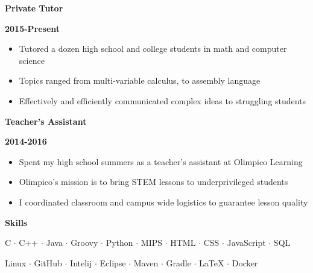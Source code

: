 \documentclass[12pt]{report}
\newcommand\barTitle[1]{\begin{center} \begin{Large}{\textbf{#1}}\end{Large}\end{center}}
\newcommand\tbf[1]{\begin{large} \textbf{#1} \end{large}}
\begin{document}
\begin{flushleft}
\tbf{Private Tutor} \hfill \tbf{2015-Present}
\end{flushleft}

\begin{itemize}
\item Tutored a dozen high school and college students in math and computer science
\item Topics ranged from multi-variable calculus, to assembly language 
\item Effectively and efficiently communicated complex ideas to struggling students 
\end{itemize}

\begin{flushleft}
\tbf{Teacher's Assistant} \hfill \tbf{2014-2016}
\end{flushleft}

\begin{itemize}
\item Spent my high school summers as a teacher's assistant at Olimpico Learning
\item Olimpico's mission is to bring STEM lessons to underprivileged students
\item I coordinated classroom and campus wide logistics to guarantee lesson quality  
\end{itemize}


\noindent\makebox[\linewidth]{\rule{7.5in}{0.4pt}}
\barTitle{Skills}
\begin{center}
C $\cdot$ C++ $\cdot$ Java $\cdot$ Groovy $\cdot$ Python $\cdot$  MIPS $\cdot$ HTML $\cdot$ CSS $\cdot$ JavaScript $\cdot$ SQL 
\end{center}
\begin{center}
 Linux $\cdot$ GitHub $\cdot$ Intelij $\cdot$ Eclipse $\cdot$ Maven $\cdot$ Gradle $\cdot$ LaTeX $\cdot$ Docker	
\end{center}
\end{document}
